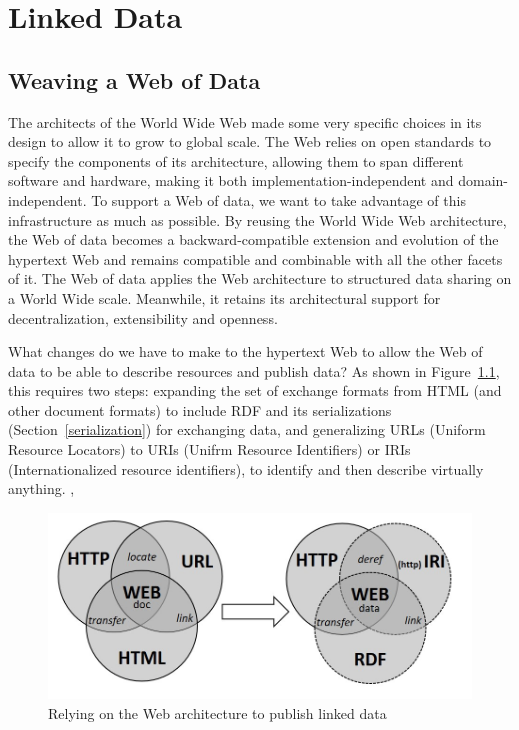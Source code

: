 \chapter{Linked Data}
\label{ch5}

\section{Weaving a Web of Data}



The architects  of the World Wide Web made some very specific choices in its design 
to allow it to grow to global scale.   The  Web relies on open standards to specify the components of its
architecture, allowing them to span different software and hardware, making it both implementation-independent and domain-independent. To
support a Web of data, we want to take advantage of this infrastructure as much as possible. 
By
reusing  the World Wide Web architecture, the Web of data
becomes a backward-compatible extension and evolution of the hypertext
Web and remains compatible and combinable with all the other facets of
it. The Web of data applies the Web architecture to structured data
sharing on a World Wide scale. Meanwhile, it retains its architectural
support for decentralization, extensibility and openness.


What changes do we have to make to the hypertext Web to allow the Web of data
to be able to describe  resources and publish data? As
shown in Figure~\ref{fig:ch5.1}, this requires two steps:  expanding the set of exchange formats from     HTML (and other document formats) to include  RDF and its serializations (Section~\ref{serialization}) for exchanging data, and generalizing 
URLs (Uniform Resource Locators) to URIs (Unifrm Resource Identifiers) 
or IRIs (Internationalized resource identifiers), to identify and then describe virtually anything. ,

\begin{figure}
    \centering
    \includegraphics[width=5.0in]{media/ch5/figure-05-01.jpg}
    \caption{Relying on the Web architecture to publish linked data}
    \label{fig:ch5.1}
\end{figure}


